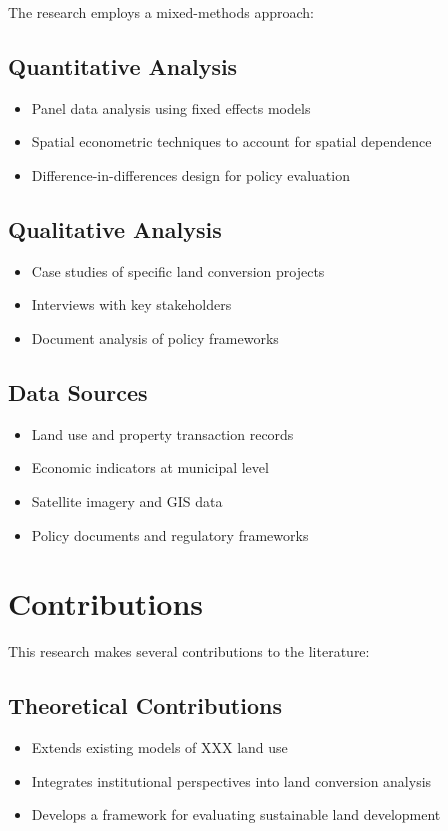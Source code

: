 The research employs a mixed-methods approach:

\subsection{Quantitative Analysis}
\begin{itemize}
    \item Panel data analysis using fixed effects models
    \item Spatial econometric techniques to account for spatial dependence
    \item Difference-in-differences design for policy evaluation
\end{itemize}

\subsection{Qualitative Analysis}
\begin{itemize}
    \item Case studies of specific land conversion projects
    \item Interviews with key stakeholders
    \item Document analysis of policy frameworks
\end{itemize}

\subsection{Data Sources}
\begin{itemize}
    \item Land use and property transaction records
    \item Economic indicators at municipal level
    \item Satellite imagery and GIS data
    \item Policy documents and regulatory frameworks
\end{itemize}

\section{Contributions}

This research makes several contributions to the literature:

\subsection{Theoretical Contributions}
\begin{itemize}
    \item Extends existing models of XXX land use
    \item Integrates institutional perspectives into land conversion analysis
    \item Develops a framework for evaluating sustainable land development
\end{itemize}

